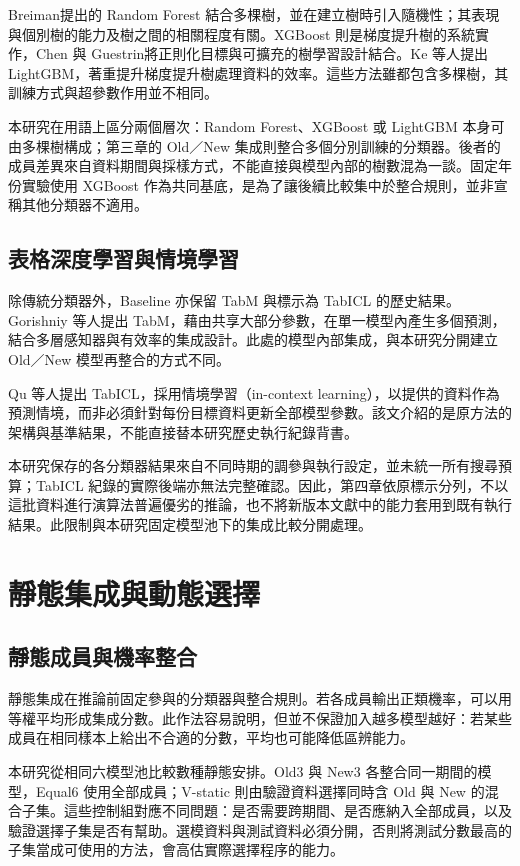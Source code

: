 Breiman\autocite{breiman2001rf}提出的 Random Forest 結合多棵樹，並在建立樹時引入隨機性；其表現與個別樹的能力及樹之間的相關程度有關。XGBoost 則是梯度提升樹的系統實作，Chen 與 Guestrin\autocite{chen2016xgboost}將正則化目標與可擴充的樹學習設計結合。Ke 等人\autocite{ke2017lightgbm}提出 LightGBM，著重提升梯度提升樹處理資料的效率。這些方法雖都包含多棵樹，其訓練方式與超參數作用並不相同。

本研究在用語上區分兩個層次：Random Forest、XGBoost 或 LightGBM 本身可由多棵樹構成；第三章的 Old／New 集成則整合多個分別訓練的分類器。後者的成員差異來自資料期間與採樣方式，不能直接與模型內部的樹數混為一談。固定年份實驗使用 XGBoost 作為共同基底，是為了讓後續比較集中於整合規則，並非宣稱其他分類器不適用。

\subsection{表格深度學習與情境學習}

除傳統分類器外，Baseline 亦保留 TabM 與標示為 TabICL 的歷史結果。Gorishniy 等人\autocite{gorishniy2025tabm}提出 TabM，藉由共享大部分參數，在單一模型內產生多個預測，結合多層感知器與有效率的集成設計。此處的模型內部集成，與本研究分開建立 Old／New 模型再整合的方式不同。

Qu 等人\autocite{qu2025tabicl}提出 TabICL，採用情境學習（in-context learning），以提供的資料作為預測情境，而非必須針對每份目標資料更新全部模型參數。該文介紹的是原方法的架構與基準結果，不能直接替本研究歷史執行紀錄背書。

本研究保存的各分類器結果來自不同時期的調參與執行設定，並未統一所有搜尋預算；TabICL 紀錄的實際後端亦無法完整確認。因此，第四章依原標示分列，不以這批資料進行演算法普遍優劣的推論，也不將新版本文獻中的能力套用到既有執行結果。此限制與本研究固定模型池下的集成比較分開處理。

\section{靜態集成與動態選擇}

\subsection{靜態成員與機率整合}

靜態集成在推論前固定參與的分類器與整合規則。若各成員輸出正類機率，可以用等權平均形成集成分數。此作法容易說明，但並不保證加入越多模型越好：若某些成員在相同樣本上給出不合適的分數，平均也可能降低區辨能力。

本研究從相同六模型池比較數種靜態安排。Old3 與 New3 各整合同一期間的模型，Equal6 使用全部成員；V-static 則由驗證資料選擇同時含 Old 與 New 的混合子集。這些控制組對應不同問題：是否需要跨期間、是否應納入全部成員，以及驗證選擇子集是否有幫助。選模資料與測試資料必須分開，否則將測試分數最高的子集當成可使用的方法，會高估實際選擇程序的能力。

